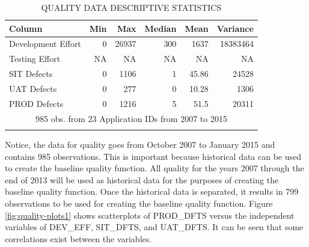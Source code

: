 \documentclass[SDSUThesis.tex]{subfiles}
\begin{document}
        
        \begin{longtable}{@{}l rr rrr}
            \toprule%
             \centering%
             {\bfseries Column}
             & {\bfseries Min}
             & {\bfseries Max}
             & {\bfseries Median}
             & {\bfseries Mean}
             & {\bfseries Variance} \\
            
            \cmidrule[0.2pt](r{0.125em}){1-1}%
            \cmidrule[0.2pt](lr{0.125em}){2-2}%
            \cmidrule[0.2pt](l{0.125em}){3-3}%
            \cmidrule[0.2pt](l{0.125em}){4-4}%
            \cmidrule[0.2pt](l{0.125em}){5-5}%
            \endhead
            
            Development Effort & 0 & 26937 & 300 & 1637 & 18383464 \\
            \myrowcolour%
            Testing Effort & NA & NA & NA & NA  & NA\\
            SIT Defects & 0 & 1106 & 1 & 45.86 & 24528 \\
            \myrowcolour%
            UAT Defects & 0 & 277 & 0 & 10.28 & 1306 \\
            PROD Defects & 0 & 1216 & 5 & 51.5 & 20311 \\
            
            \bottomrule
            
            \multicolumn{6}{c}{985 obs. from 23 Application IDs from 2007 to 2015} \\
            
            \caption{QUALITY DATA DESCRIPTIVE STATISTICS}
            \label{tab:quality_desc}
        \end{longtable}
        
        Notice, the data for quality goes from October 2007 to January 2015
        and contains 985 observations.
        This is important because historical data can be used to create the
        baseline quality function.  All quality for the years 2007 through 
        the end of 2013
        will be used as historical data for the purposes of creating
        the baseline quality function.  Once the historical data is separated,
        it results in 799 observations to be used for creating the baseline
        quality function.  Figure \ref{fig:quality-plots1} shows scatterplots
        of PROD\_DFTS versus the independent variables of DEV\_EFF, SIT\_DFTS,
        and UAT\_DFTS.  It can be seen that some correlations exist between
        the variables.
        
\end{document}
